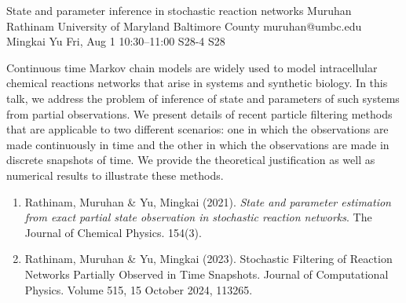 \begin{talk}
  {State and parameter inference in stochastic reaction networks}%
  {Muruhan Rathinam}%
  {University of Maryland Baltimore County}%
  {muruhan@umbc.edu}%
  {Mingkai Yu}%
  {}%
  {Fri, Aug 1 10:30--11:00}%
  {S28-4}%
  {S28}%
  
    
Continuous time Markov chain models are widely used to model intracellular chemical reactions networks that arise in systems and synthetic biology. In this talk, we address the problem of inference of state and parameters of such systems from partial observations. We present details of recent particle filtering methods that are applicable to two different scenarios: one in which the observations are made continuously in time and the other in which the observations are made in discrete snapshots of time.            We provide the theoretical justification as well as numerical results to illustrate these methods.       
   
\medskip

\begin{enumerate}
 \item[{[1]}] Rathinam, Muruhan \& Yu, Mingkai (2021). {\it State and parameter estimation from exact partial state observation in stochastic reaction networks}. The Journal of Chemical Physics. 
 154(3).
 \item[{[2]}] Rathinam, Muruhan \& Yu, Mingkai (2023). Stochastic Filtering of Reaction Networks Partially Observed in Time Snapshots. Journal of Computational Physics. 
Volume 515, 15 October 2024, 113265. 

\end{enumerate}

\end{talk}

